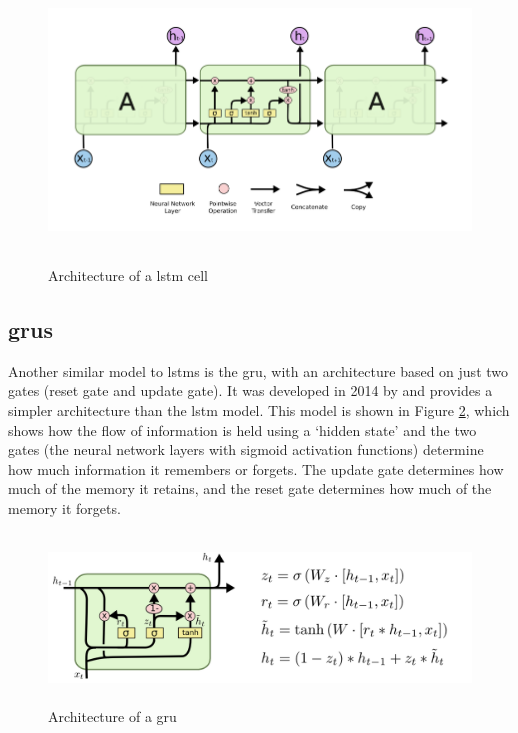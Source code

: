 \begin{figure}[h]
    \centering
    \includegraphics[height=7.5cm,trim={0 0 0 0cm},clip]{Paper/images/lstm.png}
    \caption{Architecture of a \acrlong{lstm} cell \citep{olah2015understanding}}
    \label{fig:lstm_architecture}
\end{figure}

\subsection{\acrlong{gru}s}
\label{sec:background_grus}

Another similar model to \acrshort{lstm}s is the \acrfull {gru}, with an architecture based on just two gates (reset gate and update gate). It was developed in 2014 by \citet{cho2014learning} and provides a simpler architecture than the \acrshort{lstm} model. This model is shown in Figure \ref{fig:gru_architecture}, which shows how the flow of information is held using a `hidden state' and the two gates (the neural network layers with sigmoid activation functions) determine how much information it remembers or forgets. The update gate determines how much of the memory it retains, and the reset gate determines how much of the memory it forgets.

\begin{figure}[h]
    \centering
    \includegraphics[height=4.5cm,trim={0 0 12cm 0cm},clip]{Paper/images/gru.png}
    \caption{Architecture of a \acrlong{gru} \citep{olah2015understanding}}
    \label{fig:gru_architecture}
\end{figure}

